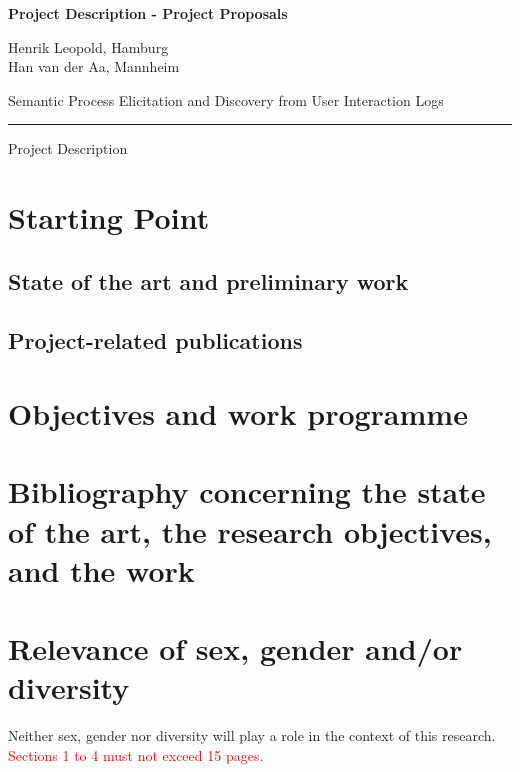 \documentclass{scrartcl}
\newcommand\todo[1]{\textcolor{red}{#1}}
\newcommand{\applicants}{\normalfont  Henrik Leopold, Hamburg \\ Han van der Aa, Mannheim \bfseries}
\newcommand{\project}{Semantic Process Elicitation and Discovery from User Interaction Logs}
\begin{document}

{\raggedright{} \normalsize \bfseries 
	Project Description - Project Proposals \par 
	\applicants{} \par
	\project{} \par
	\rule{\textwidth}{0.5pt} \par
	Project Description
}

\newenvironment{nscenter}
 {\parskip=3pt\par\nopagebreak\centering}
 {\par\noindent\ignorespacesafterend}
 
 \vspace{-1em}
\section{Starting Point}


\subsection{State of the art and preliminary work}


\subsection{Project-related publications}


\section{Objectives and work programme}


\section{Bibliography concerning the state of the art, the research objectives, and the work}
\printbibliography[heading=none]


\section{Relevance of sex, gender and/or diversity}

Neither sex, gender nor diversity will play a role in the context of this research. 
\todo{Sections 1 to 4 must not exceed 15 pages.}
\pagebreak
\end{document}
